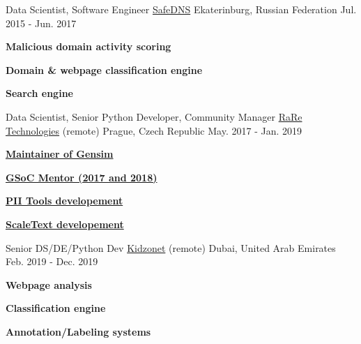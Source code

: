 


\begin{cventries}


\cventry
{Data Scientist, Software Engineer} %
{\href{https://www.safedns.com/en/}{SafeDNS}} %
{Ekaterinburg, Russian Federation} %
{Jul. 2015 - Jun. 2017} %
{ %
\begin{cvitems}
\item {\textbf{Malicious domain activity scoring}}
\item {\textbf{Domain \& webpage classification engine}}
\item {\textbf{Search engine}}
\end{cvitems}
}

\cventry
{Data Scientist, Senior Python Developer, Community Manager} %
{\href{https://rare-technologies.com/}{RaRe Technologies}} %
{(remote) Prague, Czech Republic} %
{May. 2017 - Jan. 2019}
{
\begin{cvitems}
\item {\textbf{\href{https://github.com/RaRe-Technologies/gensim}{Maintainer of Gensim}}}
\item {\textbf{\href{https://summerofcode.withgoogle.com/}{GSoC Mentor (2017 and 2018)}}}
\item {\textbf{\href{https://pii-tools.com/}{PII Tools developement}}}
\item {\textbf{\href{https://scaletext.com/}{ScaleText developement}}}
\end{cvitems}
}

\cventry
{Senior DS/DE/Python Dev} %
{\href{http://www.kidzonet.com/}{Kidzonet}} %
{(remote) Dubai, United Arab Emirates} %
{Feb. 2019 - Dec. 2019} %
{ %
\begin{cvitems}
\item {\textbf{Webpage analysis}}
\item {\textbf{Classification engine}}
\item {\textbf{Annotation/Labeling systems}}
\end{cvitems}
}


\end{cventries}
